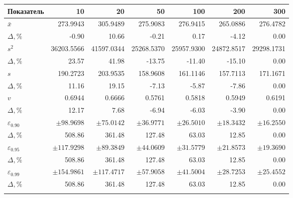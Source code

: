 \begin{tabular}{lrrrrrr}\toprule
Показатель & 10 & 20 & 50 & 100 & 200 & 300 \\\midrule
$\bar x$ & 273.9943 & 305.9489 & 275.9083 & 276.9415 & 265.0886 & 276.4782 \\
$\Delta,\%$ & -0.90 & 10.66 & -0.21 & 0.17 & -4.12 & 0.00 \\\addlinespace
$s^2$ & 36203.5566 & 41597.0344 & 25268.5370 & 25957.9300 & 24872.8517 & 29298.1731 \\
$\Delta,\%$ & 23.57 & 41.98 & -13.75 & -11.40 & -15.10 & 0.00 \\\addlinespace
$s$ & 190.2723 & 203.9535 & 158.9608 & 161.1146 & 157.7113 & 171.1671 \\
$\Delta,\%$ & 11.16 & 19.15 & -7.13 & -5.87 & -7.86 & 0.00 \\\addlinespace
$v$ & 0.6944 & 0.6666 & 0.5761 & 0.5818 & 0.5949 & 0.6191 \\
$\Delta,\%$ & 12.17 & 7.68 & -6.94 & -6.03 & -3.90 & 0.00 \\\addlinespace
$\varepsilon_{0.90}$ &  $\pm 98.9698$ &  $\pm 75.0142$ &  $\pm 36.9771$ &  $\pm 26.5010$ &  $\pm 18.3432$ &  $\pm 16.2550$ \\
$\Delta,\%$ & 508.86 & 361.48 & 127.48 & 63.03 & 12.85 & 0.00 \\\addlinespace
$\varepsilon_{0.95}$ &  $\pm 117.9298$ &  $\pm 89.3849$ &  $\pm 44.0609$ &  $\pm 31.5779$ &  $\pm 21.8573$ &  $\pm 19.3690$ \\
$\Delta,\%$ & 508.86 & 361.48 & 127.48 & 63.03 & 12.85 & 0.00 \\\addlinespace
$\varepsilon_{0.99}$ &  $\pm 154.9861$ &  $\pm 117.4717$ &  $\pm 57.9058$ &  $\pm 41.5004$ &  $\pm 28.7253$ &  $\pm 25.4552$ \\
$\Delta,\%$ & 508.86 & 361.48 & 127.48 & 63.03 & 12.85 & 0.00 \\\addlinespace
\bottomrule\end{tabular}